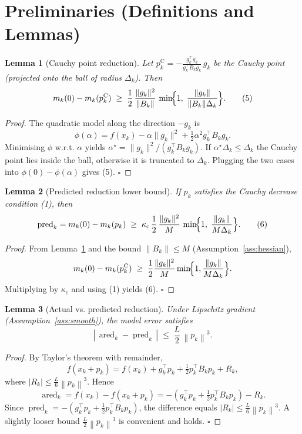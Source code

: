 \documentclass{article}
\newtheorem{lemma}{Lemma}
\newcommand{\norm}[1]{\left\lVert#1\right\rVert}
\begin{document}
\section*{Preliminaries (Definitions and Lemmas)}
\begin{lemma}[Cauchy point reduction]\label{lem:cauchy}
Let \(p_k^{\mathrm{C}} = -\frac{g_k^{\top}g_k}{g_k^{\top}B_k g_k}\,g_k\) be the
Cauchy point (projected onto the ball of radius \(\Delta_k\)).  Then
\[
m_k(0)-m_k(p_k^{\mathrm{C}})
\;\ge\;
\frac{1}{2}\,\frac{\|g_k\|^2}{\|B_k\|}\,
\min\!\Bigl\{1,\;\frac{\|g_k\|}{\|B_k\|\Delta_k}\Bigr\}.
\tag{5}
\]
\end{lemma}
\begin{proof}
The quadratic model along the direction \(-g_k\) is
\[
\phi(\alpha)=f(x_k)-\alpha \|g_k\|^2 + \tfrac12\alpha^2 g_k^{\top}B_k g_k .
\]
Minimising \(\phi\) w.r.t. \(\alpha\) yields
\(\alpha^{\star}= \|g_k\|^2/(g_k^{\top}B_k g_k)\).
If \(\alpha^{\star}\Delta_k\le\Delta_k\) the Cauchy point lies inside the ball,
otherwise it is truncated to \(\Delta_k\).  Plugging the two cases into
\(\phi(0)-\phi(\alpha)\) gives (5).  \(\square\)
\end{proof}

\begin{lemma}[Predicted reduction lower bound]\label{lem:pred-lower}
If \(p_k\) satisfies the Cauchy decrease condition (1), then
\[
\operatorname{pred}_k
= m_k(0)-m_k(p_k)
\;\ge\;
\kappa_{\mathrm{c}}\,
\frac{1}{2}\,\frac{\|g_k\|^2}{M}\,
\min\!\Bigl\{1,\;\frac{\|g_k\|}{M\Delta_k}\Bigr\}.
\tag{6}
\]
\end{lemma}
\begin{proof}
From Lemma~\ref{lem:cauchy} and the bound \(\|B_k\|\le M\) (Assumption~\ref{ass:hessian}),
\[
m_k(0)-m_k(p_k^{\mathrm{C}})
\;\ge\;
\frac12\frac{\|g_k\|^2}{M}
\min\!\Bigl\{1,\frac{\|g_k\|}{M\Delta_k}\Bigr\}.
\]
Multiplying by \(\kappa_{\mathrm{c}}\) and using (1) yields (6). \(\square\)
\end{proof}

\begin{lemma}[Actual vs. predicted reduction]\label{lem:ared-pred}
Under Lipschitz gradient (Assumption~\ref{ass:smooth}), the model error satisfies
\[
|\,\operatorname{ared}_k-\operatorname{pred}_k\,|
\;\le\;
\frac{L}{2}\,\norm{p_k}^{3}.
\tag{7}
\]
\end{lemma}
\begin{proof}
By Taylor's theorem with remainder,
\[
f(x_k+p_k) = f(x_k) + g_k^{\top}p_k + \tfrac12 p_k^{\top}B_k p_k
            + R_k,
\]
where \(|R_k|\le \frac{L}{6}\norm{p_k}^{3}\).  Hence
\[
\operatorname{ared}_k
= f(x_k)-f(x_k+p_k)
= -(g_k^{\top}p_k + \tfrac12 p_k^{\top}B_k p_k) - R_k.
\]
Since \(\operatorname{pred}_k = -(g_k^{\top}p_k + \tfrac12 p_k^{\top}B_k p_k)\),
the difference equals \(|R_k|\le \frac{L}{6}\norm{p_k}^{3}\).
A slightly looser bound \(\frac{L}{2}\norm{p_k}^{3}\) is convenient and holds.
\(\square\)
\end{proof}
\end{document}
